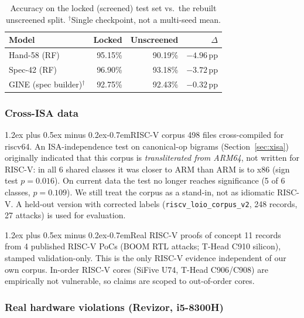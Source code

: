\documentclass[conference]{IEEEtran}
\makeatletter
\renewcommand\paragraph{\@startsection{paragraph}{4}{\z@}%
  {1.2ex plus 0.5ex minus 0.2ex}{-0.7em}{\normalfont\normalsize\bfseries}}
\makeatother
\begin{document}
\begin{table}[t]
\centering
\caption{Accuracy on the locked (screened) test set vs.\ the rebuilt
  unscreened split. $^{\dagger}$Single checkpoint, not a multi-seed mean.}
\label{tab:screening}
\footnotesize
\begin{tabular}{@{}lrrr@{}}
\toprule
Model & Locked & Unscreened & $\Delta$ \\
\midrule
Hand-58 (RF)        & 95.15\% & 90.19\% & $-4.96$\,pp \\
Spec-42 (RF)        & 96.90\% & 93.18\% & $-3.72$\,pp \\
GINE (spec builder)$^{\dagger}$ & 92.75\% & 92.43\% & $-0.32$\,pp \\
\bottomrule
\end{tabular}
\end{table}

\subsubsection{Cross-ISA data}
\label{sec:data-riscv}

\paragraph{RISC-V corpus}
498 files cross-compiled for riscv64. An ISA-independence test on
canonical-op bigrams (Section~\ref{sec:xisa}) originally indicated that this
corpus is \emph{transliterated from ARM64}, not written for RISC-V: in all 6
shared classes it was closer to ARM than ARM is to x86 (sign test $p=0.016$).
On current data the test no longer reaches significance (5 of 6 classes,
$p=0.109$). We
still treat the corpus as a stand-in, not as idiomatic RISC-V. A held-out version
with corrected labels (\texttt{riscv\_loio\_corpus\_v2}, 248 records, 27
attacks) is used for evaluation.

\paragraph{Real RISC-V proofs of concept}
11 records from 4 published RISC-V PoCs (BOOM RTL attacks; T-Head C910
silicon), stamped validation-only. This is the only RISC-V evidence
independent of our own corpus. In-order RISC-V cores (SiFive U74, T-Head
C906/C908) are empirically not vulnerable, so claims are scoped to
out-of-order cores.

\subsubsection{Real hardware violations (Revizor, i5-8300H)}
\label{sec:data-hw}
\end{document}
